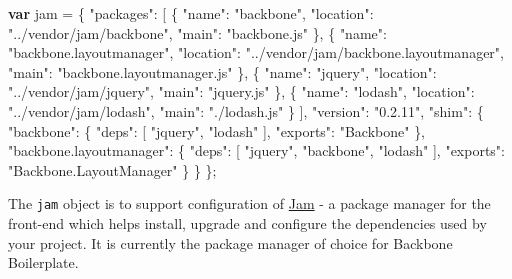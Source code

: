 \documentclass[9pt]{book}
\newenvironment{Shaded}{}{}
\newcommand{\KeywordTok}[1]{\textcolor[rgb]{0.00,0.44,0.13}{\textbf{{#1}}}}
\newcommand{\StringTok}[1]{\textcolor[rgb]{0.25,0.44,0.63}{{#1}}}
\newcommand{\NormalTok}[1]{{#1}}
\begin{document}
\begin{Shaded}
\begin{Highlighting}[]
\KeywordTok{var} \NormalTok{jam = \{}
    \StringTok{"packages"}\NormalTok{: [}
        \NormalTok{\{}
            \StringTok{"name"}\NormalTok{: }\StringTok{"backbone"}\NormalTok{,}
            \StringTok{"location"}\NormalTok{: }\StringTok{"../vendor/jam/backbone"}\NormalTok{,}
            \StringTok{"main"}\NormalTok{: }\StringTok{"backbone.js"}
        \NormalTok{\},}
        \NormalTok{\{}
            \StringTok{"name"}\NormalTok{: }\StringTok{"backbone.layoutmanager"}\NormalTok{,}
            \StringTok{"location"}\NormalTok{: }\StringTok{"../vendor/jam/backbone.layoutmanager"}\NormalTok{,}
            \StringTok{"main"}\NormalTok{: }\StringTok{"backbone.layoutmanager.js"}
        \NormalTok{\},}
        \NormalTok{\{}
            \StringTok{"name"}\NormalTok{: }\StringTok{"jquery"}\NormalTok{,}
            \StringTok{"location"}\NormalTok{: }\StringTok{"../vendor/jam/jquery"}\NormalTok{,}
            \StringTok{"main"}\NormalTok{: }\StringTok{"jquery.js"}
        \NormalTok{\},}
        \NormalTok{\{}
            \StringTok{"name"}\NormalTok{: }\StringTok{"lodash"}\NormalTok{,}
            \StringTok{"location"}\NormalTok{: }\StringTok{"../vendor/jam/lodash"}\NormalTok{,}
            \StringTok{"main"}\NormalTok{: }\StringTok{"./lodash.js"}
        \NormalTok{\}}
    \NormalTok{],}
    \StringTok{"version"}\NormalTok{: }\StringTok{"0.2.11"}\NormalTok{,}
    \StringTok{"shim"}\NormalTok{: \{}
        \StringTok{"backbone"}\NormalTok{: \{}
            \StringTok{"deps"}\NormalTok{: [}
                \StringTok{"jquery"}\NormalTok{,}
                \StringTok{"lodash"}
            \NormalTok{],}
            \StringTok{"exports"}\NormalTok{: }\StringTok{"Backbone"}
        \NormalTok{\},}
        \StringTok{"backbone.layoutmanager"}\NormalTok{: \{}
            \StringTok{"deps"}\NormalTok{: [}
                \StringTok{"jquery"}\NormalTok{,}
                \StringTok{"backbone"}\NormalTok{,}
                \StringTok{"lodash"}
            \NormalTok{],}
            \StringTok{"exports"}\NormalTok{: }\StringTok{"Backbone.LayoutManager"}
        \NormalTok{\}}
    \NormalTok{\}}
\NormalTok{\};}
\end{Highlighting}
\end{Shaded}

The \texttt{jam} object is to support configuration of
\href{http://jamjs.org/}{Jam} - a package manager for the front-end
which helps install, upgrade and configure the dependencies used by your
project. It is currently the package manager of choice for Backbone
Boilerplate.
\end{document}
